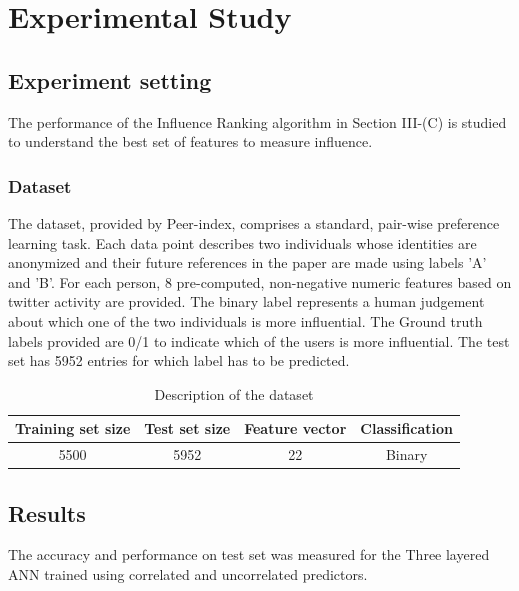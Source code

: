 \documentclass[conference]{IEEEtran}
\begin{document}
\section{Experimental Study}

\subsection{Experiment setting}

The performance of the Influence Ranking algorithm in Section III-(C) is studied to understand the best set of features to measure influence.\\

\subsubsection{Dataset}  
The dataset, provided by Peer-index, comprises a standard, pair-wise preference learning task. Each data point describes two individuals whose identities are anonymized and their future references in the paper are made using labels 'A' and 'B'. For each person, 8 pre-computed, non-negative numeric features based on twitter activity are provided. The binary label represents a human judgement about which one of the two individuals is more influential. The Ground truth labels provided are 0/1 to indicate which of the users is more influential. The test set has 5952 entries for which label has to be predicted.

\begin{table}[!h]
\renewcommand{\arraystretch}{1.3}
\caption{Description of the dataset}
\label{table}
\centering
\begin{tabular}{|c|c|c|c|}
  \hline
\multicolumn{1}{|c|}{\textbf{Training set size}} & \multicolumn{1}{c|}{\textbf{Test set size}} & \multicolumn{1}{c|}{\textbf{Feature vector}} & \multicolumn{1}{c|}{\textbf{Classification}}\\
  \hline
  5500 & 5952 &  22 & Binary\\
  \hline
\end{tabular}
\end{table}


\subsection{Results}

The accuracy and performance on test set was measured for the Three layered ANN trained using correlated and uncorrelated predictors.
\end{document}
